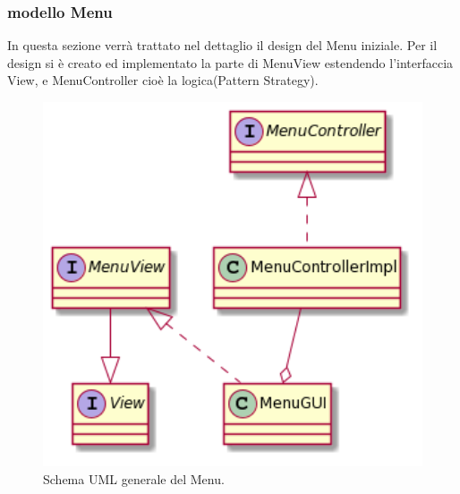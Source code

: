 \documentclass[a4paper,12pt]{report}
\begin{document}
	\subsubsection{modello Menu}
	In questa sezione verrà trattato nel dettaglio il design del Menu iniziale.
	Per il design si è creato ed implementato la parte di MenuView estendendo l'interfaccia View, e MenuController cioè la logica(Pattern Strategy).
    	\begin{figure}[h]
        \centering{}
        \includegraphics[width=150mm]{images/squarcialupi/Menu-overview.png}
        \caption{Schema UML generale del Menu.}
        \label{img:Menu-overview}
    	\end{figure}
\end{document}
